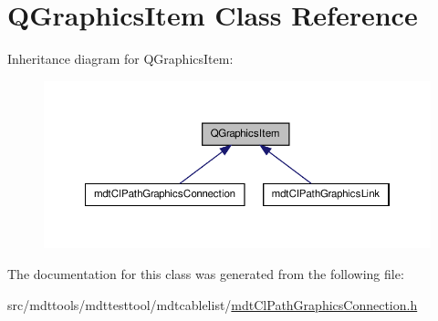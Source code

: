 \hypertarget{class_q_graphics_item}{\section{Q\-Graphics\-Item Class Reference}
\label{class_q_graphics_item}
}


Inheritance diagram for Q\-Graphics\-Item\-:\nopagebreak
\begin{figure}[H]
\begin{center}
\leavevmode
\includegraphics[width=350pt]{class_q_graphics_item__inherit__graph}
\end{center}
\end{figure}


The documentation for this class was generated from the following file\-:\begin{DoxyCompactItemize}
\item 
src/mdttools/mdttesttool/mdtcablelist/\hyperlink{mdt_cl_path_graphics_connection_8h}{mdt\-Cl\-Path\-Graphics\-Connection.\-h}\end{DoxyCompactItemize}

